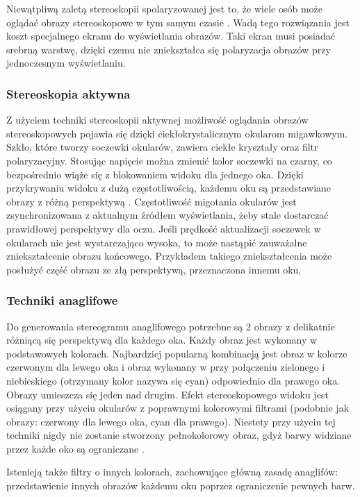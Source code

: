 Niewątpliwą zaletą stereoskopii spolaryzowanej jest to, że wiele osób może oglądać obrazy stereoskopowe w tym samym czasie \cite{russianpage}. Wadą tego rozwiązania jest koszt specjalnego ekranu do wyświetlania obrazów. Taki ekran musi posiadać srebrną warstwę, dzięki czemu nie zniekształca się polaryzacja obrazów przy jednoczesnym wyświetlaniu.

\subsubsection{Stereoskopia aktywna} 
Z użyciem techniki stereoskopii aktywnej możliwość oglądania obrazów stereoskopowych pojawia się dzięki ciekłokrystalicznym okularom migawkowym. Szkło, które tworzy soczewki okularów, zawiera ciekłe kryształy oraz filtr polaryzacyjny. Stosując napięcie można zmienić kolor soczewki na czarny, co bezpośrednio wiąże się z blokowaniem widoku dla jednego oka. Dzięki przykrywaniu widoku z dużą częstotliwością, każdemu oku są przedstawiane obrazy z różną perspektywą \cite{active3d}. Częstotliwość migotania okularów jest zsynchronizowana z aktualnym źródłem wyświetlania, żeby stale dostarczać prawidłowej perspektywy dla oczu. Jeśli prędkość aktualizacji soczewek w okularach nie jest wystarczająco wysoka, to może nastąpić zauważalne zniekształcenie obrazu końcowego. Przykładem takiego zniekształcenia może posłużyć część obrazu ze złą perspektywą, przeznaczona innemu oku.

\subsubsection{Techniki anaglifowe}
Do generowania stereogramu anaglifowego potrzebne są 2 obrazy z delikatnie różniącą się perspektywą dla każdego oka. Każdy obraz jest wykonany w podstawowych kolorach. Najbardziej popularną kombinacją jest obraz w kolorze czerwonym dla lewego oka i obraz wykonany w przy połączeniu zielonego i niebieskiego (otrzymany kolor nazywa się cyan) odpowiednio dla prawego oka. Obrazy umieszcza się jeden nad drugim. Efekt stereoskopowego widoku jest osiągany przy użyciu okularów z poprawnymi kolorowymi filtrami (podobnie jak obrazy: czerwony dla lewego oka, cyan dla prawego). Niestety przy użyciu tej techniki nigdy nie zostanie stworzony pełnokolorowy obraz, gdyż barwy widziane przez każde oko są ograniczane \cite{anaglif}. 

Istenieją także filtry o innych kolorach, zachowujące główną zasadę anaglifów: przedstawienie innych obrazów każdemu oku poprzez ograniczenie pewnych barw.

